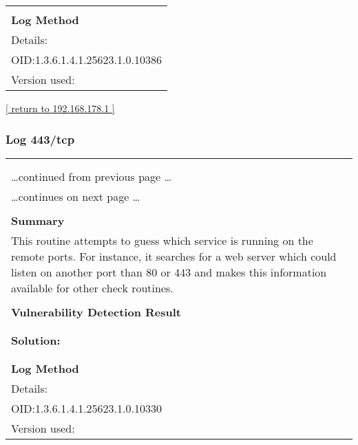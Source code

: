 \documentclass{article}
\begin{document}
\begin{longtable}{|p{}|}
        \hline
        \\
\textbf{Log Method}\\
Details:
\rowcolor{white}{\verb=Response Time / No 404 Error Code Check=}\\
OID:1.3.6.1.4.1.25623.1.0.10386\\
Version used:
\rowcolor{white}{\verb=2020-11-27T13:32:50Z=}\\
\end{longtable}

\begin{footnotesize}\hyperref[host:192.168.178.1]{[ return to 192.168.178.1 ]}\end{footnotesize}
\subsubsection{Log 443/tcp}
\label{port:192.168.178.1 443/tcp Log}

\begin{longtable}{|p{}|}
\hline
\rowcolor{gvm_log}{\color{white}{Log (CVSS: 0.0) }}\\
\rowcolor{gvm_log}{\color{white}{NVT: Services}}\\
\hline
\endfirsthead
\hfill\ldots continued from previous page \ldots \\
\hline
\endhead
\hline
\ldots continues on next page \ldots \\
\endfoot
\hline
\endlastfoot
\\
\textbf{Summary}\\
This routine attempts to guess which service is running on the
  remote ports. For instance, it searches for a web server which could listen on another port than
  80 or 443 and makes this information available for other check routines.\\

        \hline
        \\
\textbf{Vulnerability Detection Result}\\
\rowcolor{white}{\verb=A TLScustom server answered on this port=}\\

          \hline
          \\
\textbf{Solution:}\\
\\


        \hline
        \\
\textbf{Log Method}\\
Details:
\rowcolor{white}{\verb=Services=}\\
OID:1.3.6.1.4.1.25623.1.0.10330\\
Version used:
\rowcolor{white}{\verb=2021-03-15T10:42:03Z=}\\
\end{longtable}
\end{document}
